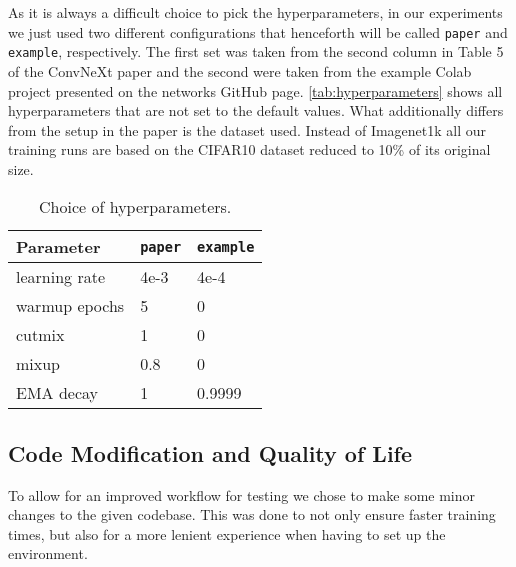 \documentclass{article}
\begin{document}
    As it is always a difficult choice to pick the hyperparameters, in our experiments we just used two different configurations that henceforth will be called \texttt{paper} and \texttt{example}, respectively.
    The first set was taken from the second column in Table 5 of the ConvNeXt\cite{liu2022convnet} paper and the second were taken from the example Colab project presented on the networks GitHub page\cite{ayush0finetune}.
    \autoref{tab:hyperparameters} shows all hyperparameters that are not set to the default values.
    What additionally differs from the setup in the paper is the dataset used.
    Instead of Imagenet1k all our training runs are based on the CIFAR10\cite{krizhevsky2009learning} dataset reduced to 10\% of its original size.
    \begin{table}[h]
        \caption{Choice of hyperparameters.}
        \begin{center}
            \begin{tabular}{lll}
                \hline
                Parameter     & \texttt{paper} & \texttt{example} \\ \hline
                learning rate & 4e-3           & 4e-4             \\
                warmup epochs & 5              & 0                \\
                cutmix        & 1              & 0                \\
                mixup         & 0.8            & 0                \\
                EMA decay     & 1              & 0.9999
            \end{tabular}
        \end{center}
        \label{tab:hyperparameters}
    \end{table}

    \subsection{Code Modification and Quality of Life}\label{subsec:code-modification}
    To allow for an improved workflow for testing we chose to make some minor changes to the given codebase.
    This was done to not only ensure faster training times, but also for a more lenient experience when having to set up the environment.
\end{document}
